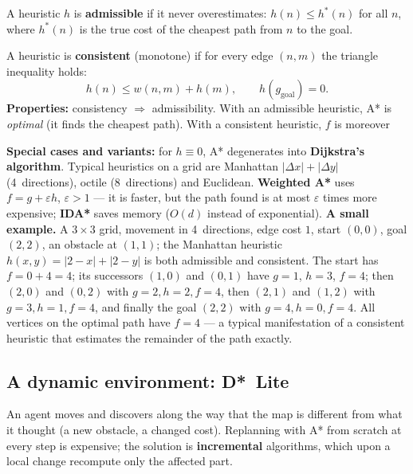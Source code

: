 \documentclass[11pt,a4paper]{article}
\theoremstyle{definition}
\begin{document}
\begin{defbox}
A heuristic $h$ is \textbf{admissible} if it never overestimates:
$h(n) \le h^*(n)$ for all $n$, where $h^*(n)$ is the true cost of the cheapest path from $n$ to the
goal.

A heuristic is \textbf{consistent} (monotone) if for every edge $(n,m)$ the triangle inequality
holds:
\[
h(n) \le w(n,m) + h(m), \qquad h(g_{\mathrm{goal}}) = 0 .
\]
\textbf{Properties:} consistency $\Rightarrow$ admissibility. With an admissible heuristic, A* is
\emph{optimal} (it finds the cheapest path). With a consistent heuristic, $f$ is moreover
\end{defbox}

\textbf{Special cases and variants:} for $h \equiv 0$, A* degenerates into \textbf{Dijkstra's
algorithm}. Typical heuristics on a grid are Manhattan $|\Delta x| + |\Delta y|$ (4~directions),
octile (8~directions) and Euclidean. \textbf{Weighted A*} uses
$f = g + \varepsilon h$, $\varepsilon > 1$ --- it is faster, but the path found is at most
$\varepsilon$ times more expensive; \textbf{IDA*} saves memory ($O(d)$ instead of exponential).
\medskip
\noindent\textbf{A small example.} A $3\times3$ grid, movement in 4~directions, edge cost $1$,
start $(0,0)$, goal $(2,2)$, an obstacle at $(1,1)$; the Manhattan heuristic
$h(x,y) = |2-x| + |2-y|$ is both admissible and consistent. The start has $f=0+4=4$; its successors
$(1,0)$ and $(0,1)$ have $g=1$, $h=3$, $f=4$; then $(2,0)$ and $(0,2)$ with $g=2,h=2,f=4$, then
$(2,1)$ and $(1,2)$ with $g=3,h=1,f=4$, and finally the goal $(2,2)$ with $g=4,h=0,f=4$. All vertices
on the optimal path have $f=4$ --- a typical manifestation of a consistent heuristic that estimates
the remainder of the path exactly.

\subsection{A dynamic environment: D*~Lite}

An agent moves and discovers along the way that the map is different from what it thought (a
new obstacle, a changed cost). Replanning with A* from scratch at every step is expensive; the
solution is \textbf{incremental} algorithms, which upon a local change recompute only the
affected part.
\end{document}
